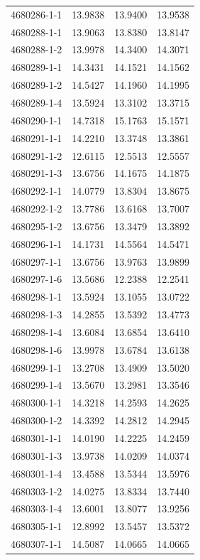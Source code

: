 \begin{longtable}{lrrr}
4680286-1-1 & 13.9838 & 13.9400 & 13.9538 \\
4680288-1-1 & 13.9063 & 13.8380 & 13.8147 \\
4680288-1-2 & 13.9978 & 14.3400 & 14.3071 \\
4680289-1-1 & 14.3431 & 14.1521 & 14.1562 \\
4680289-1-2 & 14.5427 & 14.1960 & 14.1995 \\
4680289-1-4 & 13.5924 & 13.3102 & 13.3715 \\
4680290-1-1 & 14.7318 & 15.1763 & 15.1571 \\
4680291-1-1 & 14.2210 & 13.3748 & 13.3861 \\
4680291-1-2 & 12.6115 & 12.5513 & 12.5557 \\
4680291-1-3 & 13.6756 & 14.1675 & 14.1875 \\
4680292-1-1 & 14.0779 & 13.8304 & 13.8675 \\
4680292-1-2 & 13.7786 & 13.6168 & 13.7007 \\
4680295-1-2 & 13.6756 & 13.3479 & 13.3892 \\
4680296-1-1 & 14.1731 & 14.5564 & 14.5471 \\
4680297-1-1 & 13.6756 & 13.9763 & 13.9899 \\
4680297-1-6 & 13.5686 & 12.2388 & 12.2541 \\
4680298-1-1 & 13.5924 & 13.1055 & 13.0722 \\
4680298-1-3 & 14.2855 & 13.5392 & 13.4773 \\
4680298-1-4 & 13.6084 & 13.6854 & 13.6410 \\
4680298-1-6 & 13.9978 & 13.6784 & 13.6138 \\
4680299-1-1 & 13.2708 & 13.4909 & 13.5020 \\
4680299-1-4 & 13.5670 & 13.2981 & 13.3546 \\
4680300-1-1 & 14.3218 & 14.2593 & 14.2625 \\
4680300-1-2 & 14.3392 & 14.2812 & 14.2945 \\
4680301-1-1 & 14.0190 & 14.2225 & 14.2459 \\
4680301-1-3 & 13.9738 & 14.0209 & 14.0374 \\
4680301-1-4 & 13.4588 & 13.5344 & 13.5976 \\
4680303-1-2 & 14.0275 & 13.8334 & 13.7440 \\
4680303-1-4 & 13.6001 & 13.8077 & 13.9256 \\
4680305-1-1 & 12.8992 & 13.5457 & 13.5372 \\
4680307-1-1 & 14.5087 & 14.0665 & 14.0665 \\

\end{longtable}
